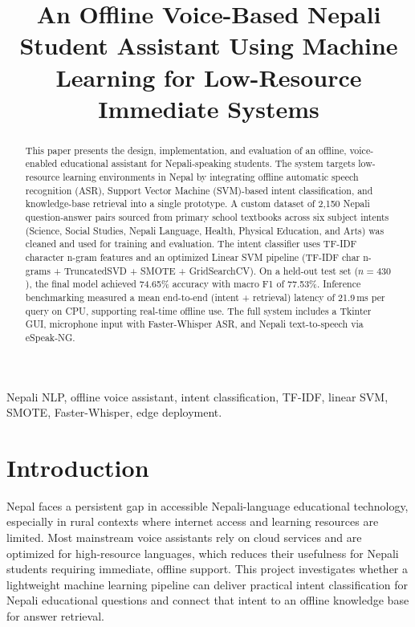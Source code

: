 \documentclass[conference]{IEEEtran}
\begin{document}
\title{An Offline Voice-Based Nepali Student Assistant Using Machine Learning for Low-Resource Immediate Systems}

\author{
}

\maketitle

\begin{abstract}
This paper presents the design, implementation, and evaluation of an offline, voice-enabled educational assistant for Nepali-speaking students. The system targets low-resource learning environments in Nepal by integrating offline automatic speech recognition (ASR), Support Vector Machine (SVM)-based intent classification, and knowledge-base retrieval into a single prototype. A custom dataset of 2{,}150 Nepali question-answer pairs sourced from primary school textbooks across six subject intents (Science, Social Studies, Nepali Language, Health, Physical Education, and Arts) was cleaned and used for training and evaluation. The intent classifier uses TF-IDF character n-gram features and an optimized Linear SVM pipeline (TF-IDF char n-grams + TruncatedSVD + SMOTE + GridSearchCV). On a held-out test set ($n=430$), the final model achieved 74.65\% accuracy with macro F1 of 77.53\%. Inference benchmarking measured a mean end-to-end (intent + retrieval) latency of 21.9\,ms per query on CPU, supporting real-time offline use. The full system includes a Tkinter GUI, microphone input with Faster-Whisper ASR, and Nepali text-to-speech via eSpeak-NG.
\end{abstract}

\begin{IEEEkeywords}
Nepali NLP, offline voice assistant, intent classification, TF-IDF, linear SVM, SMOTE, Faster-Whisper, edge deployment.
\end{IEEEkeywords}

\section{Introduction}
Nepal faces a persistent gap in accessible Nepali-language educational technology, especially in rural contexts where internet access and learning resources are limited. Most mainstream voice assistants rely on cloud services and are optimized for high-resource languages, which reduces their usefulness for Nepali students requiring immediate, offline support. This project investigates whether a lightweight machine learning pipeline can deliver practical intent classification for Nepali educational questions and connect that intent to an offline knowledge base for answer retrieval.
\end{document}
